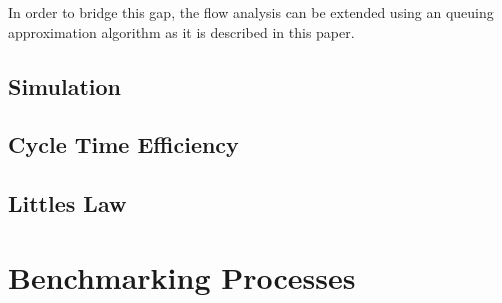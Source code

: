 In order to bridge this gap, the flow analysis can be extended using an queuing approximation algorithm as it is described in this paper\cite{ha2006approximate}.


\subsection{Simulation}


\subsection{Cycle Time Efficiency}
\subsection{Littles Law}
\section{Benchmarking Processes}


